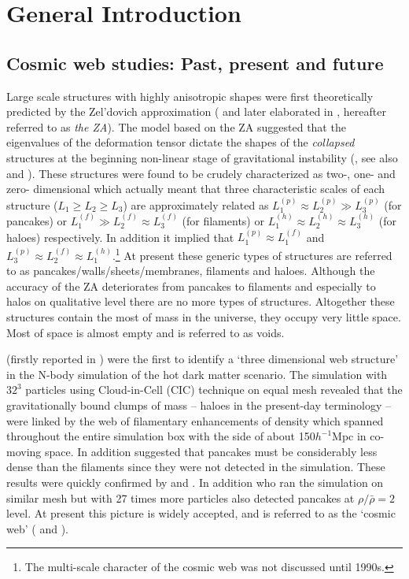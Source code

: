 
\chapter{General Introduction}

\section{Cosmic web studies: Past, present and future}

Large scale structures with  highly anisotropic shapes were first theoretically predicted by the Zel'dovich approximation (\citealt{Zeldovich1970} and later elaborated in \citealt{Shandarin1989}, hereafter referred to as {\it the ZA}). The model based on the ZA suggested that the eigenvalues of the deformation tensor dictate the shapes of the {\it collapsed} structures at the beginning non-linear stage of gravitational instability (\citealt{Arnold1982}, see also \citealt{Shandarin1989} and \citealt{Hidding2014}). These structures were found to be crudely  characterized as two-, one- and zero- dimensional  which actually meant that three characteristic scales of each structure ($L_1\ge L_2\ge L_3$) are approximately related as  $L_1^{(p)} \approx L_2^{(p)} \gg L_3^{(p)}$ (for pancakes) or $L_1^{(f)} \gg L_2^{(f)} \approx L_3^{(f)}$ (for filaments) or $L_1^{(h)} \approx L_2^{(h)}  \approx L_3^{(h)} $ (for haloes) respectively.  In addition it implied that $L_1^{(p)} \approx L_1^{(f)}$ and $L_3^{(p)} \approx L_2^{(f)} \approx L_1^{(h)}$.\footnote{The multi-scale character of the cosmic web was not discussed until 1990s.} At present these generic types of structures are referred to as pancakes/walls/sheets/membranes, filaments and haloes. Although the accuracy of the ZA deteriorates from pancakes to  filaments and especially to halos on qualitative level  there are no more types of  structures. Altogether these structures contain the most of mass in the universe, they occupy  very little space. Most of space is almost empty and is referred to as voids.

\cite{Klypin1983a} (firstly reported  in \citealt{Shandarin1983}) were the first to identify a `three dimensional web structure' in the N-body simulation of the hot dark matter scenario. The simulation with $32^3$ particles using Cloud-in-Cell (CIC) technique on equal mesh revealed  that the gravitationally bound clumps of mass -- haloes in the present-day terminology --  were linked by the web of filamentary enhancements of density which spanned throughout the entire simulation box with the side of about 150$h^{-1}$Mpc in co-moving space. In addition \cite{Klypin1983a}  suggested that pancakes must be considerably less dense than the filaments since they were not detected in the simulation. These  results were quickly confirmed by \cite{Centrella1983} and \cite{Frenk1983}. In addition \cite{Centrella1983} who ran the simulation on similar mesh but with 27 times more particles also detected pancakes at $\rho/\bar{\rho} = 2$ level. At present this picture is widely accepted, and is referred to as the `cosmic web' (\citealt{Bond1996} and \citealt{Weygaert2008c}). 

